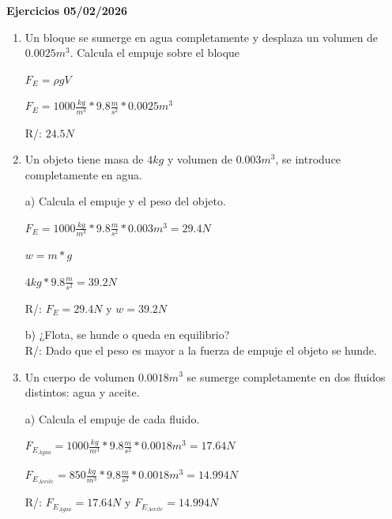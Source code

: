 \documentclass[a4paper, 11pt]{article}
\newcommand{\Pspace}{0.5cm}
\newcommand{\Aspace}{0.2cm}
\begin{document}
    \vspace{\Pspace}
    {\Large \textbf{Ejercicios 05/02/2026}}
    \begin{enumerate}
        \vspace{\Pspace}
        \item Un bloque se sumerge en agua completamente y desplaza un volumen de $0.0025m^3$. Calcula el empuje sobre el bloque\par
            \vspace{\Aspace} \par
            { \color{azul}  
                $F_{E} = \rho g V$ 
                \par $F_{E} = 1000\frac{kg}{m^3} * 9.8\frac{m}{s^2} * 0.0025 m^3$
                \par R/: $24.5 N$
            }



        \vspace{\Pspace}
        \item Un objeto tiene masa de $4kg$ y volumen de $0.003m^3$, se introduce completamente en agua.\par
            \vspace{\Aspace} \par
            a) Calcula el empuje y el peso del objeto.
            \\ { \color{azul} 
                $F_{E} = 1000\frac{kg}{m^3} * 9.8\frac{m}{s^2} * 0.003 m^3 = 29.4N$
                \par $w = m * g$
                \par $4kg * 9.8\frac{m}{s^2} = 39.2N$
                \par R/: $F_{E} = 29.4N$ y $w = 39.2N$
            }

            \vspace{\Aspace} \par
            b) ¿Flota, se hunde o queda en equilibrio?
            \\ { \color{azul} R/: Dado que el peso es mayor a la fuerza de empuje el objeto se hunde. }



        \vspace{\Pspace}
        \item Un cuerpo de volumen $0.0018m^3$ se sumerge completamente en dos fluidos distintos: agua y aceite.\par
            \vspace{\Aspace} \par
            a) Calcula el empuje de cada fluido.
            \\ { \color{azul} 
                $F_{E_{Agua}} = 1000 \frac{kg}{m^3} * 9.8\frac{m}{s^2} * 0.0018m^3 = 17.64N$
                \par $F_{E_{Aceite}} = 850 \frac{kg}{m^3} * 9.8\frac{m}{s^2} * 0.0018m^3 = 14.994N$
                \par R/: $F_{E_{Agua}} = 17.64N$ y $F_{E_{Aceite}} = 14.994N$
            }


\end{enumerate}
\end{document}
